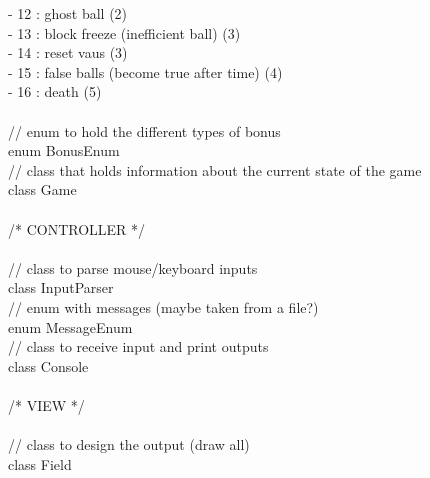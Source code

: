  - 12 : ghost ball (2)\\
 - 13 : block freeze (inefficient ball) (3)\\
 - 14 : reset vaus (3)\\
 - 15 : false balls (become true after time) (4)\\
 - 16 : death (5)\\
\\
// enum to hold the different types of bonus\\
enum BonusEnum\\
// class that holds information about the current state of the game\\
class Game\\
\\
/* CONTROLLER */\\
\\
// class to parse mouse/keyboard inputs\\
class InputParser\\
// enum with messages (maybe taken from a file?)\\
enum MessageEnum\\
// class to receive input and print outputs\\
class Console\\
\\
/* VIEW */\\
\\
// class to design the output (draw all)\\
class Field\\

